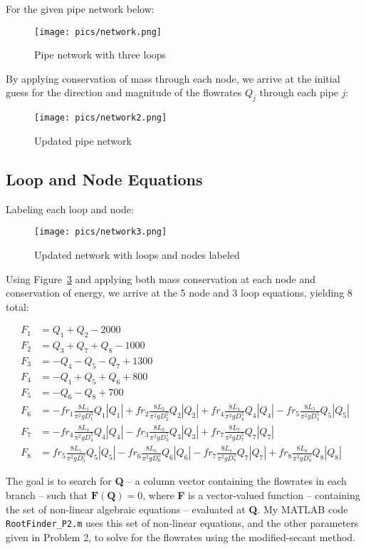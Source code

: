 \documentclass{article}
\newcommand{\Darcy}[1]{fr_#1\frac{8L_#1}{\pi^2gD_#1^5}Q_#1|Q_#1|}
\begin{document}
For the given pipe network below:

\begin{figure}[h]
    \centering
    \texttt{[image: pics/network.png]}
    \caption{Pipe network with three loops}
    \label{pipe}
\end{figure}

By applying conservation of mass through each node, we arrive at the initial guess for the direction and magnitude of the flowrates $Q_j$ through each pipe $j$:

\begin{figure}[h]
    \centering
    \texttt{[image: pics/network2.png]}
    \caption{Updated pipe network}
    \label{pipe2}
\end{figure}

\pagebreak

\subsection{Loop and Node Equations}

Labeling each loop and node:

\begin{figure}[h]
    \centering
    \texttt{[image: pics/network3.png]}
    \caption{Updated network with loops and nodes labeled}
    \label{pipe3}
\end{figure}

Using Figure~\ref{pipe3} and applying both mass conservation at each node and conservation of energy, we arrive at the 5 node and 
3 loop equations, yielding 8 total:
\begin{tcolorbox}[colback=red!5!white,colframe=red!50!black,title=Solution -- (\textbf{Note}: Flowrates are in $\mathrm{m^3/hr}$)]
    \vspace{-\baselineskip}
    \begin{align*}
        F_1 &= Q_1 + Q_2 - 2000 \\
        F_2 &= Q_3 + Q_7 + Q_8 - 1000 \\
        F_3 &= -Q_4 -Q_5 - Q_7 + 1300 \\
        F_4 &= -Q_1 + Q_5 + Q_6 + 800 \\
        F_5 &= -Q_6 -Q_8 + 700 \\
        F_6 &= -\Darcy{1} + \Darcy{2} + \Darcy{4} - \Darcy{5} \\
        F_7 &= -\Darcy{4} - \Darcy{3} + \Darcy{7} \\
        F_8 &=  \Darcy{5} - \Darcy{6} - \Darcy{7} + \Darcy{8}
    \end{align*}
\end{tcolorbox}

The goal is to search for \textbf{Q} -- a column vector containing the flowrates in each branch -- such that $\textbf{F}(\textbf{Q})=0$, where 
\textbf{F} is a vector-valued function -- containing the set of non-linear algebraic equations -- evaluated at \textbf{Q}.
My MATLAB code \lstinline[style=matlabstyle]|RootFinder_P2.m| uses this
set of non-linear equations, and the other parameters given in Problem 2, to solve for the flowrates using the 
modified-secant method. 
\end{document}

